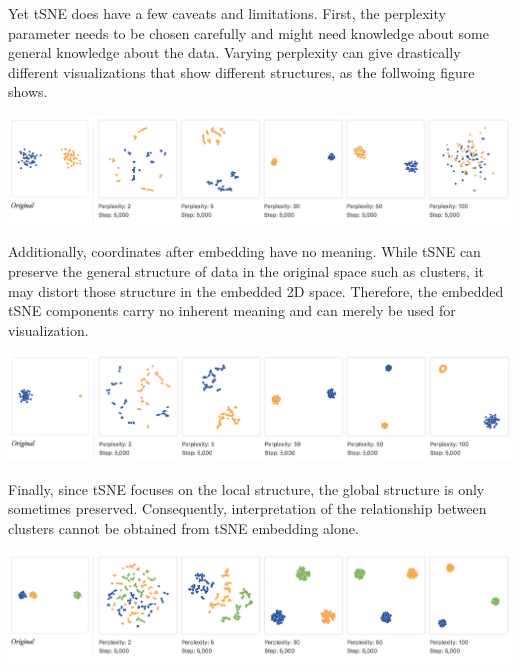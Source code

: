 Yet tSNE does have a few caveats and limitations. First, the
perplexity parameter needs to be chosen carefully and might need
knowledge about some general knowledge about the data. Varying
perplexity can give drastically different visualizations that show
different structures, as the follwoing figure shows. 

\begin{center}
    \includegraphics[scale=0.32]{chapter_7/files/fig4.png}
\end{center}

Additionally, coordinates after embedding have no meaning. While tSNE
can preserve the general structure of data in the original space such
as clusters, it may distort those structure in the embedded 2D
space. Therefore, the embedded tSNE components carry no inherent
meaning and can merely be used for visualization. 

\begin{center}
    \includegraphics[scale=0.5]{chapter_7/files/fig5.png}
\end{center}

Finally, since tSNE focuses on the local structure, the global
structure is only sometimes preserved. Consequently, interpretation of
the relationship between clusters cannot be obtained from tSNE
embedding alone. 

\begin{center}
    \includegraphics[scale=0.5]{chapter_7/files/fig6.png}
\end{center}

